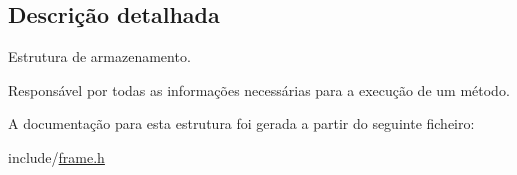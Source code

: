 \subsection{Descrição detalhada}
Estrutura de armazenamento. 

Responsável por todas as informações necessárias para a execução de um método. 

A documentação para esta estrutura foi gerada a partir do seguinte ficheiro\+:\begin{DoxyCompactItemize}
\item 
include/\hyperlink{frame_8h}{frame.\+h}\end{DoxyCompactItemize}
